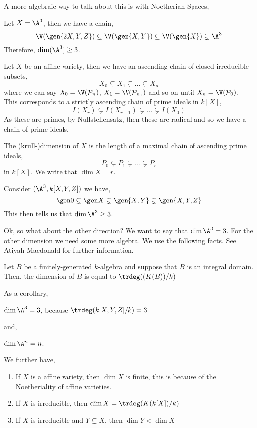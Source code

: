\noindent
A more algebraic way to talk about this is with Noetherian Spaces,
\begin{eg}
  Let $X = \A^3$, then we have a chain,
  $$ \V(\gen{2X, Y, Z}) \subsetneq \V(\gen{X, Y}) \subsetneq \V(\gen{X}) \subsetneq \A^3$$
  Therefore, $\dim (\A^3) \ge 3$.
\end{eg}

\noindent
Let $X$ be an affine variety, then we have an ascending chain of closed irreducible subsets,
$$ X_0 \subsetneq X_1 \subsetneq \dots \subsetneq X_n $$
where we can say $X_0 = \V(\mathcal{P}_n)$, $X_1 = \V(\mathcal{P}_{n_1})$ and so on until $X_n = \V(\mathcal{P}_0)$. This corresponds to a strictly ascending chain of prime ideals in $k[X]$,
$$ I(X_r) \subsetneq I(X_{r-1}) \subsetneq \dots \subsetneq I(X_0) $$
As these are primes, by Nullstellensatz, then these are radical and so we have a chain of prime ideals.
\begin{ndefi}
  The (krull-)dimension of $X$ is the length of a maximal chain of ascending prime ideals,
  $$ P_0 \subsetneq P_1 \subsetneq \dots \subsetneq P_r $$
  in $k[X]$. We write that $\dim X = r$.
\end{ndefi}

\begin{eg}
  Consider $(\A^3, k[X, Y, Z])$ we have,
  $$ \gen 0 \subsetneq \gen X \subsetneq \gen{X, Y} \subsetneq \gen{X, Y, Z} $$
  This then tells us that $\dim \A^3 \ge 3$.
\end{eg}

\noindent
Ok, so what about the other direction? We want to say that $\dim \A^3 = 3$. For the other dimension we need some more algebra. We use the following facts. See Atiyah-Macdonald for further information.
\begin{nthm}[]
  Let $B$ be a finitely-generated $k$-algebra and suppose that
  $B$ is an integral domain. Then, the dimension of $B$ is equal to $\trdeg((K(B))/k)$
\end{nthm}
\noindent
As a corollary,
\begin{ncor}
  $\dim \A^3 = 3$, because $\trdeg (k[X, Y, Z] / k) = 3$
\end{ncor}
\noindent
and,
\begin{ncor}
   $\dim \A^n = n$.
\end{ncor}
\noindent
We further have,
\begin{enumerate}
  \item If $X$ is a affine variety, then $\dim X$ is finite, this is because of the Noetheriality of affine varieties.
  \item If $X$ is irreducible, then $\dim X = \trdeg (K(k[X])/k)$
  \item If $X$ is irreducible and $Y \subsetneq X$, then $\dim Y < \dim X$
\end{enumerate}

